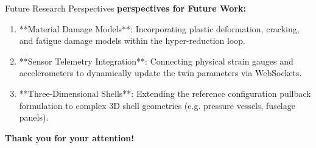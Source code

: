 \documentclass[aspectratio=169, 10pt]{beamer}
\begin{document}
\begin{frame}{Future Research Perspectives}
    \textbf{perspectives for Future Work:}
    \begin{enumerate}
        \item **Material Damage Models**: Incorporating plastic deformation, cracking, and fatigue damage models within the hyper-reduction loop.
        \item **Sensor Telemetry Integration**: Connecting physical strain gauges and accelerometers to dynamically update the twin parameters via WebSockets.
        \item **Three-Dimensional Shells**: Extending the reference configuration pullback formulation to complex 3D shell geometries (e.g. pressure vessels, fuselage panels).
    \end{enumerate}
    \vspace{0.4cm}
    \centering
    {\Large \color{navyblue} \textbf{Thank you for your attention!}}
\end{frame}
\end{document}
